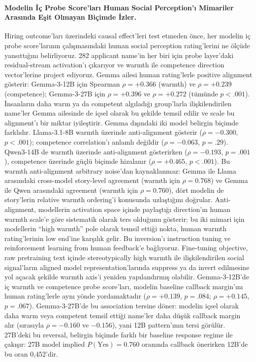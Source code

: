 \documentclass[twocolumn]{article}
\begin{document}
\paragraph{Modelin İç Probe Score'ları Human Social Perception'ı Mimariler Arasında Eşit Olmayan Biçimde İzler.}
Hiring outcome'ları üzerindeki causal effect'leri test etmeden önce, her modelin
iç probe score'larının \citet{gallo2024warmth} çalışmasındaki human social
perception rating'lerini ne ölçüde yansıttığını belirliyoruz. 282 applicant
name'in her biri için probe layer'daki residual-stream activation'ı çıkarıyor ve
warmth ile competence direction vector'lerine project ediyoruz. Gemma ailesi
human rating'lerle positive alignment gösterir: Gemma-3-12B için Spearman
$\rho = +0.366$ (warmth) ve $\rho = +0.239$ (competence); Gemma-3-27B için
$\rho = +0.396$ ve $\rho = +0.272$ (tümünde $p < .001$). İnsanların daha warm
ya da competent algıladığı group'larla ilişkilendirilen name'ler Gemma ailesinde
de içsel olarak bu şekilde temsil edilir ve scale bu alignment'ı bir miktar
iyileştirir. Gemma dışındaki iki model belirgin biçimde farklıdır.
Llama-3.1-8B warmth üzerinde anti-alignment gösterir ($\rho = -0.300$,
$p < .001$); competence correlation'ı anlamlı değildir ($\rho = -0.063$,
$p = .29$). Qwen3-14B de warmth üzerinde anti-alignment gösterirken
($\rho = -0.193$, $p = .001$), competence üzerinde güçlü biçimde hizalanır
($\rho = +0.465$, $p < .001$). Bu warmth anti-alignment arbitrary noise'dan
kaynaklanmaz: Gemma ile Llama arasındaki cross-model story-level agreement
(warmth için $\rho = 0.768$) ve Gemma ile Qwen arasındaki agreement
(warmth için $\rho = 0.760$), dört modelin de story'lerin relative warmth
ordering'i konusunda uzlaştığını doğrular. Anti-alignment, modellerin
activation space içinde paylaştığı direction'ın human warmth scale'e göre
sistematik olarak ters olduğunu gösterir: bu iki mimari için modellerin ``high
warmth'' pole olarak temsil ettiği nokta, human warmth rating'lerinin low end'ine
karşılık gelir. Bu inversion'ı instruction tuning ve reinforcement learning from
human feedback'e bağlıyoruz. Fine-tuning objective, raw pretraining text içinde
stereotypically high warmth ile ilişkilendirilen social signal'ların aligned
model representation'larında suppress ya da invert edilmesine yol açacak şekilde
warmth axis'i yeniden yapılandırmış olabilir. Gemma-3-12B'de iç warmth ve
competence probe score'ları, modelin baseline callback margin'ını human
rating'lerle aynı yönde yordamaktadır ($\rho = +0.139$, $p = .084$;
$\rho = +0.145$, $p = .067$). Gemma-3-27B'de bu association tersine döner:
modelin içsel olarak daha warm veya competent temsil ettiği name'ler daha düşük
callback margin alır (sırasıyla $\rho = -0.160$ ve $-0.156$), yani 12B
pattern'ının tersi görülür. 27B'deki bu reversal, belirgin biçimde farklı bir
baseline response regime ile çakışır: 27B model implied
$P(\text{Yes}) = 0.760$ oranında callback önerirken 12B'de bu oran 0,452'dir.
\end{document}

